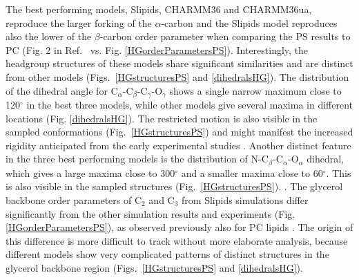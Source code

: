 \documentclass[aps,prl,superscriptaddress,twocolumn]{revtex4}
\begin{document}
The best performing models,
Slipids, CHARMM36 and CHARMM36ua, reproduce the larger forking of the $\alpha$-carbon 
and the Slipids model reproduces also the lower of the $\beta$-carbon order parameter
when comparing the PS results to PC (Fig. 2 in Ref.~ vs. Fig. \ref{HGorderParametersPS}).
Interestingly, the headgroup structures of these models share significant similarities
and are distinct from other models (Figs.~\ref{HGstructuresPS} and \ref{dihedralsHG}). 
The distribution of the dihedral angle for C$_\alpha$-C$_\beta$-C$_\gamma$-O$_\gamma$ shows
a single narrow maximum close to 120$^{\circ}$ in the best three models, while other models give several maxima
in different locations (Fig. \ref{dihedralsHG}). The restricted motion is also
visible in the sampled conformations (Fig.~\ref{HGstructuresPS}) and might
manifest the increased rigidity anticipated from the early experimental studies \cite{browning80,buldt81}.
Another distinct feature in the three best performing models is the distribution
of N-C$_\beta$-C$_\alpha$-O$_\alpha$ dihedral, which gives a large maxima close to 300$^{\circ}$
and a smaller maxima close to 60$^{\circ}$. This is also visible in the sampled
structures (Fig.~\ref{HGstructuresPS}).
.
The glycerol backbone order parameters of C$_2$ and C$_3$ from Slipids simulations
differ significantly from the other simulation results and experiments (Fig. \ref{HGorderParametersPS}),
as observed previously also for PC lipids \cite{botan15}.
The origin of this difference is more difficult to track without more elaborate analysis,
because different models show very complicated patterns of distinct structures
in the glycerol backbone region (Figs.~\ref{HGstructuresPS} and \ref{dihedralsHG}).


\end{document}
